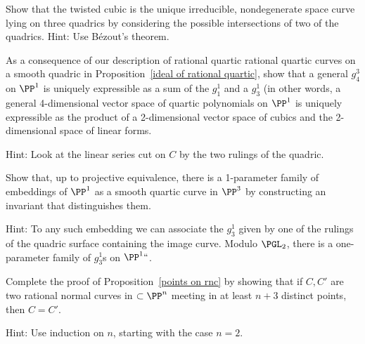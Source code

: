 \begin{exercise}
Show that the 
twisted cubic
%
is the unique irreducible, nondegenerate space curve lying on three quadrics by considering the possible
intersections of two of the quadrics. Hint: Use 
B\'ezout's theorem.
%
\end{exercise}

\begin{exercise}\label{decomposition of a $g^3_4$}
As a consequence of our description of 
rational quartic
rational quartic curves on a smooth quadric in Proposition~\ref{ideal of rational quartic},
show that a general $g^3_4$ on $\PP^1$ is uniquely expressible as a sum of the $g_1^1$ and a $g^1_3$
(in other words, a general 4-dimensional vector space of quartic polynomials on $\PP^1$ is uniquely expressible as the product of a 2-dimensional vector space of cubics and the 2-dimensional space of linear forms.

Hint: Look at the linear series cut on $C$ by the two rulings of the quadric.
\end{exercise}

\begin{exercise}\label{distinguishing rational quartics}
Show that, up to projective equivalence, there is a 1-parameter family of embeddings of $\PP^1$ as a 
smooth quartic curve in $\PP^3$ 
by constructing an invariant that distinguishes them. 

Hint:  
To
any such embedding we can associate the $g^1_3$ given by one of the
rulings of the quadric surface containing the image curve. Modulo
$\PGL_2$, there is a one-parameter family of $g^1_3$s on $\PP^1` `$.
\end{exercise}

\begin{exercise}\label{Castelnuovo uniqueness}
Complete the proof of Proposition~\ref{points on rnc} by showing that
if $C, C'$ are two rational normal curves in $\subset \PP^n$ 
meeting in at least $n+3$ distinct points, then $C = C'$. 

Hint: Use induction on $n$, starting with the case $n=2$.
\end{exercise}


